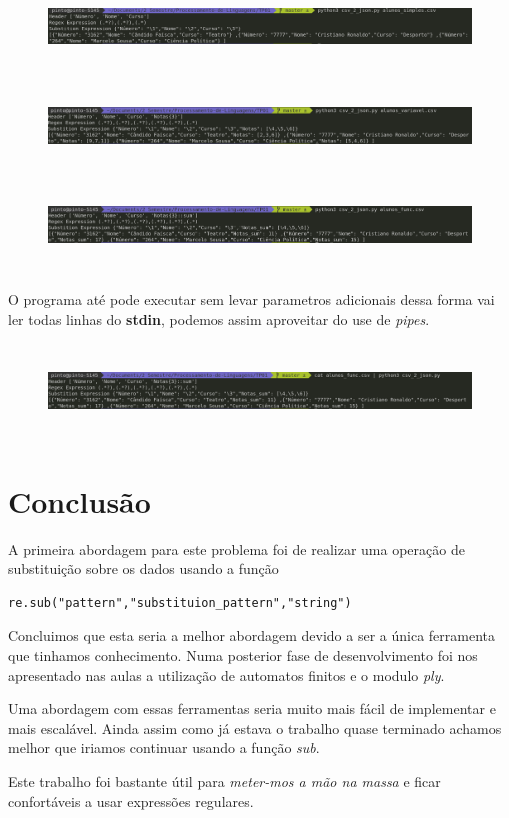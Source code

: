 \documentclass[runningheads]{llncs}
\begin{document}
\begin{figure}
    \includegraphics[width=150mm,height=25mm]{pl04.png}
    \includegraphics[width=150mm,height=25mm]{pl05.png}
    \includegraphics[width=150mm,height=25mm]{pl06.png}
\end{figure}
O programa até pode executar sem levar parametros adicionais dessa forma vai ler todas linhas do \textbf{stdin}, podemos assim aproveitar do use de \textit{pipes}.
\begin{figure}
    \includegraphics[width=150mm,height=25mm]{pl07.png}
\end{figure}

\newpage

\section{Conclusão}
A primeira abordagem para este problema foi de realizar uma operação de substituição sobre os dados usando a função
\begin{verbatim}
re.sub("pattern","substituion_pattern","string")
\end{verbatim}
Concluimos que esta seria a melhor abordagem devido a ser a única ferramenta que tinhamos conhecimento. Numa posterior fase de desenvolvimento foi nos apresentado nas aulas a utilização de automatos finitos e o modulo \textit{ply}.


Uma abordagem com essas ferramentas seria muito mais fácil de implementar e mais escalável. Ainda assim como já estava o trabalho quase terminado achamos melhor que iriamos continuar usando a função \textit{sub}.

\vspace{5mm}
Este trabalho foi bastante útil para \textit{meter-mos a mão na massa} e ficar confortáveis a usar expressões regulares.
\end{document}
